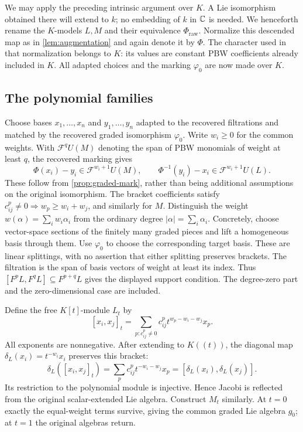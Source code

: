 We may apply the preceding intrinsic argument over $K$. A Lie
isomorphism obtained there will extend to $k$; no embedding of $k$
in $\mathbb C$ is needed. We henceforth rename the $K$-models $L,M$ and their equivalence
$\Phi_{\mathrm{raw}}$. Normalize this descended map as in \cref{lem:augmentation}
and again denote it by $\Phi$. The character used in that
normalization belongs to $K$: its values are constant PBW
coefficients already included in $K$. All adapted choices
and the marking $\varphi_0$ are now made over $K$.

\subsection{The polynomial families}

Choose bases $x_1,\ldots,x_n$ and $y_1,\ldots,y_n$ adapted to the
recovered filtrations and matched by the recovered graded isomorphism $\varphi_0$.
Write $w_i\geq0$ for the common weights. With
$\mathcal F^qU(M)$ denoting the span of PBW monomials of
weight at least $q$, the recovered marking gives
\begin{equation}\label{eq:rees-leading}
 \Phi(x_i)-y_i\in\mathcal F^{w_i+1}U(M),\qquad
 \Phi^{-1}(y_i)-x_i\in\mathcal F^{w_i+1}U(L).
\end{equation}
These follow from \cref{prop:graded-mark}, rather than being additional assumptions on the
original isomorphism. The bracket coefficients satisfy
$c_{ij}^p\ne0\Rightarrow w_p\geq w_i+w_j$, and similarly for
$M$. Distinguish the weight
$w(\alpha)=\sum_iw_i\alpha_i$ from the ordinary degree
$|\alpha|=\sum_i\alpha_i$.
Concretely, choose vector-space sections of the finitely many graded
pieces and lift a homogeneous basis through them. Use $\varphi_0$
to choose the corresponding target basis. These are linear
splittings, with no assertion that either splitting preserves brackets.
The filtration is the span of basis vectors of weight at least
its index. Thus $[F^pL,F^qL]\subseteq F^{p+q}L$ gives the
displayed support condition. The degree-zero part and the
zero-dimensional case are included.

Define the free $K[t]$-module $L_t$ by
\begin{equation}\label{eq:rees-bracket}
 [x_i,x_j]_t=\sum_{p:c_{ij}^p\ne0}
 c_{ij}^p t^{w_p-w_i-w_j}x_p.
\end{equation}
All exponents are nonnegative. After extending to $K((t))$, the
diagonal map $\delta_L(x_i)=t^{-w_i}x_i$ preserves this bracket:
\[
 \delta_L([x_i,x_j]_t)
 =\sum_pc_{ij}^pt^{-w_i-w_j}x_p
 =[\delta_L(x_i),\delta_L(x_j)].
\]
Its restriction to the polynomial module is injective. Hence Jacobi
is reflected from the original scalar-extended Lie algebra.
Construct $M_t$ similarly. At $t=0$ exactly the
equal-weight terms survive, giving the common graded Lie algebra
$g_0$; at $t=1$ the original algebras return.

